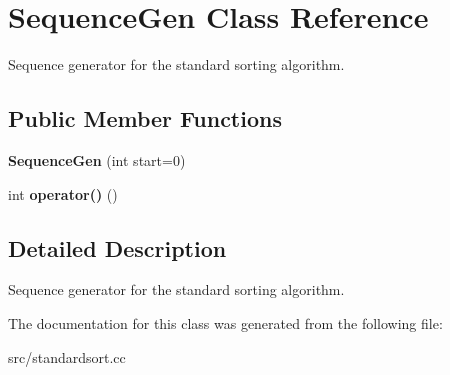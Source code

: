 \hypertarget{classSequenceGen}{
\section{SequenceGen Class Reference}
\label{d4/d99/classSequenceGen}
}


Sequence generator for the standard sorting algorithm.  
\subsection*{Public Member Functions}
\begin{DoxyCompactItemize}
\item 
\hypertarget{classSequenceGen_a4d1ef90f7ec766284371caf9e6c4f791}{
{\bfseries SequenceGen} (int start=0)}
\label{d4/d99/classSequenceGen_a4d1ef90f7ec766284371caf9e6c4f791}

\item 
\hypertarget{classSequenceGen_af63e6e7ae3a2fdcb86a6ed263f953c84}{
int {\bfseries operator()} ()}
\label{d4/d99/classSequenceGen_af63e6e7ae3a2fdcb86a6ed263f953c84}

\end{DoxyCompactItemize}


\subsection{Detailed Description}
Sequence generator for the standard sorting algorithm. 

The documentation for this class was generated from the following file:\begin{DoxyCompactItemize}
\item 
src/standardsort.cc\end{DoxyCompactItemize}
